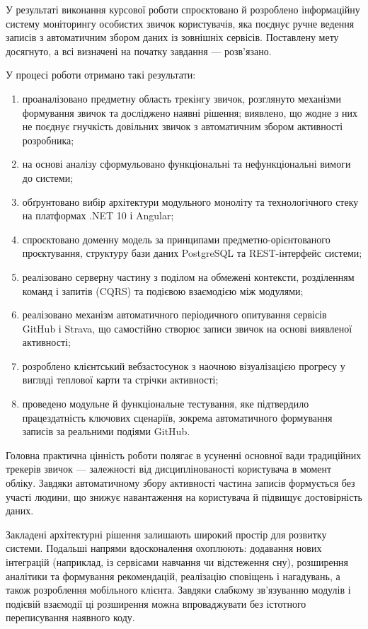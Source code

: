 
У результаті виконання курсової роботи спроєктовано й розроблено інформаційну систему моніторингу особистих звичок користувачів, яка поєднує ручне ведення записів з автоматичним збором даних із зовнішніх сервісів. Поставлену мету досягнуто, а всі визначені на початку завдання — розв'язано.

У процесі роботи отримано такі результати:

\begin{enumerate}[noitemsep, topsep=2pt, leftmargin=*, label=\arabic*)]
    \item проаналізовано предметну область трекінгу звичок, розглянуто механізми формування звичок та досліджено наявні рішення; виявлено, що жодне з них не поєднує гнучкість довільних звичок з автоматичним збором активності розробника;
    \item на основі аналізу сформульовано функціональні та нефункціональні вимоги до системи;
    \item обґрунтовано вибір архітектури модульного моноліту та технологічного стеку на платформах .NET 10 і Angular;
    \item спроєктовано доменну модель за принципами предметно-орієнтованого проєктування, структуру бази даних PostgreSQL та REST-інтерфейс системи;
    \item реалізовано серверну частину з поділом на обмежені контексти, розділенням команд і запитів (CQRS) та подієвою взаємодією між модулями;
    \item реалізовано механізм автоматичного періодичного опитування сервісів GitHub і Strava, що самостійно створює записи звичок на основі виявленої активності;
    \item розроблено клієнтський вебзастосунок з наочною візуалізацією прогресу у вигляді теплової карти та стрічки активності;
    \item проведено модульне й функціональне тестування, яке підтвердило працездатність ключових сценаріїв, зокрема автоматичного формування записів за реальними подіями GitHub.
\end{enumerate}

Головна практична цінність роботи полягає в усуненні основної вади традиційних трекерів звичок — залежності від дисциплінованості користувача в момент обліку. Завдяки автоматичному збору активності частина записів формується без участі людини, що знижує навантаження на користувача й підвищує достовірність даних.

Закладені архітектурні рішення залишають широкий простір для розвитку системи. Подальші напрями вдосконалення охоплюють: додавання нових інтеграцій (наприклад, із сервісами навчання чи відстеження сну), розширення аналітики та формування рекомендацій, реалізацію сповіщень і нагадувань, а також розроблення мобільного клієнта. Завдяки слабкому зв'язуванню модулів і подієвій взаємодії ці розширення можна впроваджувати без істотного переписування наявного коду.
